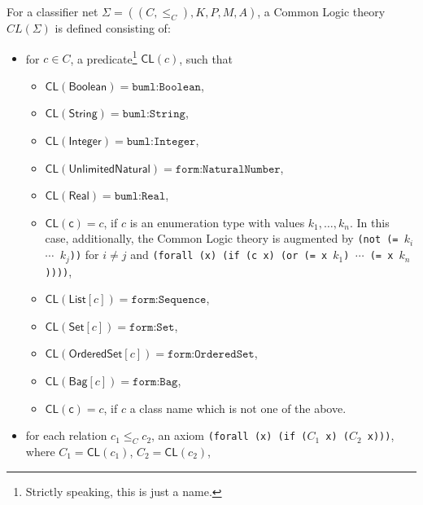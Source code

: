 \documentclass[10pt,fleqn,final]{scrreprt}
\newcommand*{\CL}{\ensuremath{\mathsf{CL}}\xspace}
\newenvironment{definitions}[0]{\medskip }{}
\begin{document}
\begin{definitions}
For a classifier net
$\Sigma = ((C, {\leq_C}), K, P, M, A)$, a Common Logic theory
$CL(\Sigma)$ is defined consisting of:
%
\begin{itemize} %
\item for $c \in C$, a predicate\footnote{Strictly speaking, this is just a name.} $\CL(c)$,  such that
\begin{itemize} %
\item 
  $\CL(\mathsf{Boolean}) = \texttt{buml:Boolean}$, 
\item 
  $\CL(\mathsf{String}) = \texttt{buml:String}$,
\item 
  $\CL(\mathsf{Integer}) = \texttt{buml:Integer}$,
\item 
  $\CL(\mathsf{UnlimitedNatural}) = \texttt{form:NaturalNumber}$,
\item 
  $\CL(\mathsf{Real}) = \texttt{buml:Real}$,
\item 
  $\CL(\mathsf{c}) = c$, if $c$ is an enumeration type with values $k_1,\ldots,k_n$. In this case, additionally, the Common Logic theory is augmented by
\texttt{(not (= $k_i$ $\cdots$ $k_j$))} for $i\neq j$ and
\texttt{(forall (x) (if (c x) (or (= x $k_1$) $\cdots$ (= x $k_n$))))},
\item 
  $\CL(\mathsf{List}[c]) = \texttt{form:Sequence}$,
\item 
  $\CL(\mathsf{Set}[c]) = \texttt{form:Set}$,
\item 
  $\CL(\mathsf{OrderedSet}[c]) = \texttt{form:OrderedSet}$,
\item 
  $\CL(\mathsf{Bag}[c]) = \texttt{form:Bag}$,
\item 
  $\CL(\mathsf{c}) = c$, if $c$ a class name which is not one of the above. 
\end{itemize}
\item for each relation $c_1
  \leq_C c_2$, an axiom \texttt{(forall (x) (if ($C_1$ x) ($C_2$ x)))},
  where $C_1 = \CL(c_1)$, $C_2 = \CL(c_2)$, 


\end{itemize}
\end{definitions}
\end{document}
